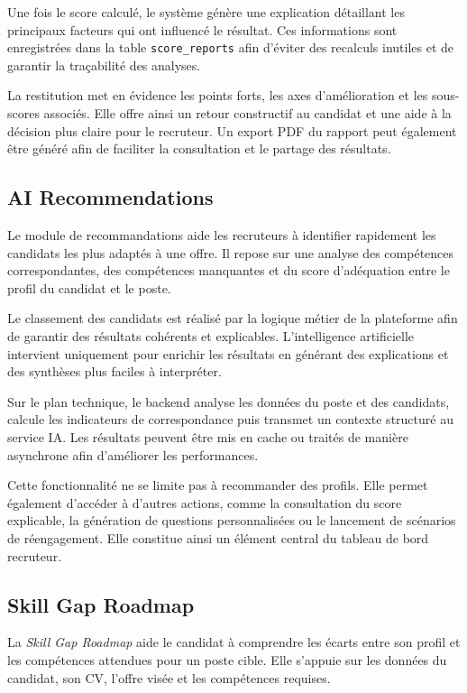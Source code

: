 Une fois le score calculé, le système génère une explication détaillant les principaux facteurs qui ont influencé le résultat. Ces informations sont enregistrées dans la table \texttt{score\_reports} afin d'éviter des recalculs inutiles et de garantir la traçabilité des analyses.

La restitution met en évidence les points forts, les axes d'amélioration et les sous-scores associés. Elle offre ainsi un retour constructif au candidat et une aide à la décision plus claire pour le recruteur. Un export PDF du rapport peut également être généré afin de faciliter la consultation et le partage des résultats.


\subsection{AI Recommendations}

Le module de recommandations aide les recruteurs à identifier rapidement les candidats les plus adaptés à une offre. Il repose sur une analyse des compétences correspondantes, des compétences manquantes et du score d'adéquation entre le profil du candidat et le poste.

Le classement des candidats est réalisé par la logique métier de la plateforme afin de garantir des résultats cohérents et explicables. L'intelligence artificielle intervient uniquement pour enrichir les résultats en générant des explications et des synthèses plus faciles à interpréter.

Sur le plan technique, le backend analyse les données du poste et des candidats, calcule les indicateurs de correspondance puis transmet un contexte structuré au service IA. Les résultats peuvent être mis en cache ou traités de manière asynchrone afin d'améliorer les performances.

Cette fonctionnalité ne se limite pas à recommander des profils. Elle permet également d'accéder à d'autres actions, comme la consultation du score explicable, la génération de questions personnalisées ou le lancement de scénarios de réengagement. Elle constitue ainsi un élément central du tableau de bord recruteur.

\subsection{Skill Gap Roadmap}

La \textit{Skill Gap Roadmap} aide le candidat à comprendre les écarts entre son profil et les compétences attendues pour un poste cible. Elle s'appuie sur les données du candidat, son CV, l'offre visée et les compétences requises.

